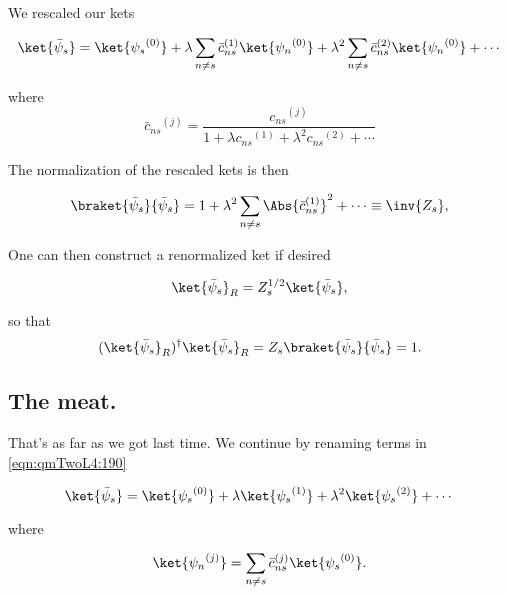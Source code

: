 We rescaled our kets 

\begin{equation}\label{eqn:qmTwoL4:190}
\ket{\bar{\psi}_s} 
=
\ket{{\psi_s}^{(0)}} 
+ 
\lambda
\sum_{n \ne s} {\bar{c}_{ns}}^{(1)} \ket{{\psi_n}^{(0)}} 
+
\lambda^2
\sum_{n \ne s} {\bar{c}_{ns}}^{(2)} \ket{{\psi_n}^{(0)}} 
+ \cdots
\end{equation}

where
\begin{equation}\label{eqn:qmTwoL4:210}
{\bar{c}_{ns}}^{(j)} = 
\frac{{c_{ns}}^{(j)}}
{
1 
+ \lambda {c_{ns}}^{(1)} 
+ \lambda^2 {c_{ns}}^{(2)} 
+ \cdots
}
\end{equation}

The normalization of the rescaled kets is then

\begin{equation}\label{eqn:qmTwoL4:230}
\braket{\bar{\psi}_s}{\bar{\psi}_s} 
=
1
+ 
\lambda^2
\sum_{n \ne s} \Abs{{\bar{c}_{ns}}^{(1)}}^2
+
\cdots
\equiv \inv{Z_s},
\end{equation}

One can then construct a renormalized ket if desired

\begin{equation}\label{eqn:qmTwoL4:250}
\ket{\bar{\psi}_s}_R = Z_s^{1/2} \ket{\bar{\psi}_s},
\end{equation}

so that
\begin{equation}\label{eqn:qmTwoL4:270}
(\ket{\bar{\psi}_s}_R)^\dagger \ket{\bar{\psi}_s}_R = Z_s \braket{\bar{\psi}_s}{\bar{\psi}_s} = 1.
\end{equation}

\subsection{The meat.}

That's as far as we got last time.  We continue by renaming terms in \ref{eqn:qmTwoL4:190}

\begin{equation}\label{eqn:qmTwoL4:300}
\ket{\bar{\psi}_s} 
=
\ket{{\psi_s}^{(0)}} 
+ 
\lambda \ket{{\psi_s}^{(1)}} 
+ 
\lambda^2 \ket{{\psi_s}^{(2)}} 
+ \cdots
\end{equation}

where

\begin{equation}\label{eqn:qmTwoL4:320}
\ket{{\psi_n}^{(j)}} = \sum_{n \ne s} {\bar{c}_{ns}}^{(j)} \ket{{\psi_s}^{(0)}}.
\end{equation}

